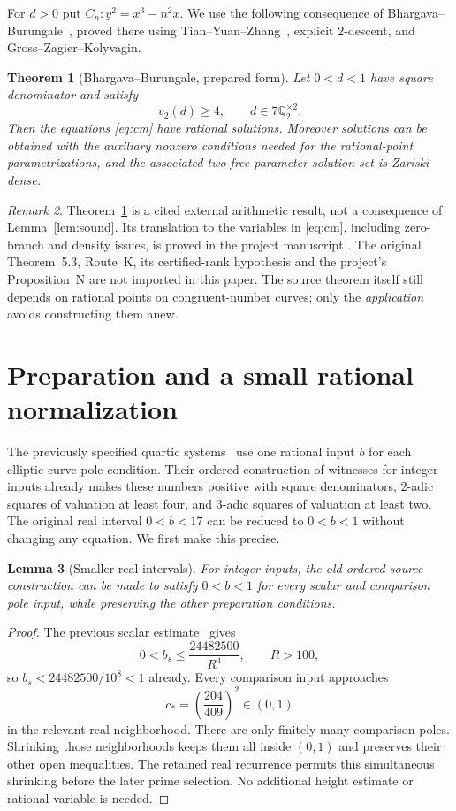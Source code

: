 \documentclass[11pt,a4paper]{article}
\newtheorem{theorem}{Theorem}[section]
\newtheorem{lemma}[theorem]{Lemma}
\theoremstyle{remark}
\newtheorem{remark}[theorem]{Remark}
\newcommand{\Q}{\mathbb Q}
\begin{document}
For $d>0$ put $C_n:y^2=x^3-n^2x$.
We use the following consequence of
Bhargava--Burungale~\cite[Theorem~2.3 and Lemma~2.2]{BB},
proved there using Tian--Yuan--Zhang~\cite{TYZ},
explicit $2$-descent, and Gross--Zagier--Kolyvagin.

\begin{theorem}[Bhargava--Burungale, prepared form]
\label{thm:bb}
Let $0<d<1$ have square denominator and satisfy
\[
 v_2(d)\ge4,\qquad d\in7\Q_2^{\times2}.
\]
Then the equations \eqref{eq:cm} have rational solutions.
Moreover solutions can be obtained with the auxiliary
nonzero conditions needed for the rational-point
parametrizations, and the associated two free-parameter
solution set is Zariski dense.
\end{theorem}
\begin{remark}
Theorem~\ref{thm:bb} is a cited external arithmetic result,
not a consequence of Lemma~\ref{lem:sound}. Its translation to
the variables in \eqref{eq:cm}, including zero-branch and
density issues, is proved in the project manuscript
\cite[Section~3]{Intrinsic}. The original Theorem~5.3,
Route~K, its certified-rank hypothesis and the project's
Proposition~N are not imported in this paper.
The source theorem itself still depends on rational points
on congruent-number curves; only the \emph{application}
avoids constructing them anew.
\end{remark}

\section{Preparation and a small rational normalization}

The previously specified quartic systems~\cite{V82} use one
rational input $b$ for each elliptic-curve pole condition.
Their ordered construction of witnesses for integer inputs
already makes these numbers positive with square denominators,
$2$-adic squares of valuation at least four, and $3$-adic
squares of valuation at least two. The original real interval
$0<b<17$ can be reduced to $0<b<1$ without changing any
equation. We first make this precise.

\begin{lemma}[Smaller real intervals]\label{lem:real}
For integer inputs, the old ordered source construction
can be made to satisfy $0<b<1$ for every scalar and
comparison pole input, while preserving the other
preparation conditions.
\end{lemma}
\begin{proof}
The previous scalar estimate~\cite[Section~7]{V82} gives
\[
  0<b_s\le \frac{24482500}{R^4},\qquad R>100,
\]
so $b_s<24482500/10^8<1$ already. Every comparison
input approaches
\[
 c_*=\left(\frac{204}{409}\right)^2\in(0,1)
\]
in the relevant real neighborhood. There are only
finitely many comparison poles. Shrinking those
neighborhoods keeps them all inside $(0,1)$ and
preserves their other open inequalities. The retained
real recurrence permits this simultaneous shrinking
before the later prime selection. No additional height
estimate or rational variable is needed.
\end{proof}
\end{document}
